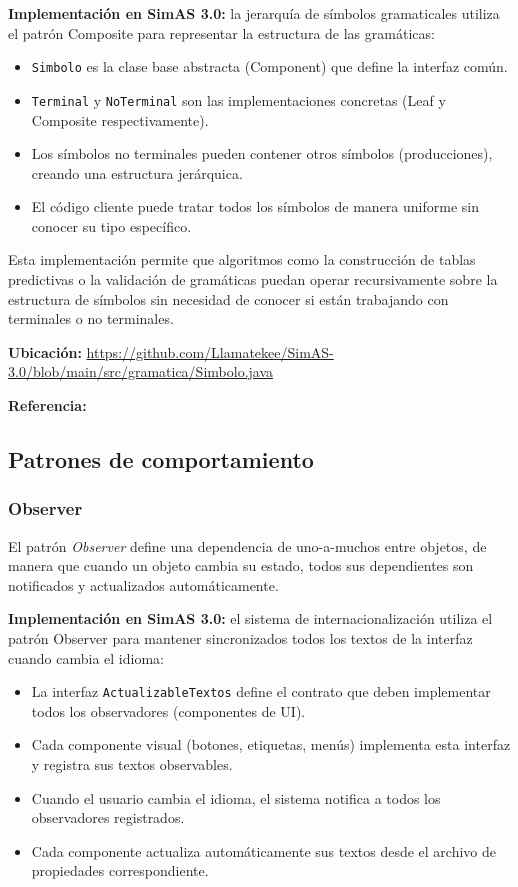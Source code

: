 \textbf{Implementación en SimAS 3.0:} la jerarquía de símbolos gramaticales utiliza el patrón Composite para representar la estructura de las gramáticas:

\begin{itemize}
    \item \texttt{Simbolo} es la clase base abstracta (Component) que define la interfaz común.
    \item \texttt{Terminal} y \texttt{NoTerminal} son las implementaciones concretas (Leaf y Composite respectivamente).
    \item Los símbolos no terminales pueden contener otros símbolos (producciones), creando una estructura jerárquica.
    \item El código cliente puede tratar todos los símbolos de manera uniforme sin conocer su tipo específico.
\end{itemize}

Esta implementación permite que algoritmos como la construcción de tablas predictivas o la validación de gramáticas puedan operar recursivamente sobre la estructura de símbolos sin necesidad de conocer si están trabajando con terminales o no terminales.

\textbf{Ubicación:} \url{https://github.com/Llamatekee/SimAS-3.0/blob/main/src/gramatica/Simbolo.java}

\textbf{Referencia:} \cite[pp. 163-173]{gamma1994design}

\subsection{Patrones de comportamiento}

\subsubsection{Observer}

El patrón \textit{Observer} define una dependencia de uno-a-muchos entre objetos, de manera que cuando un objeto cambia su estado, todos sus dependientes son notificados y actualizados automáticamente.

\textbf{Implementación en SimAS 3.0:} el sistema de internacionalización utiliza el patrón Observer para mantener sincronizados todos los textos de la interfaz cuando cambia el idioma:

\begin{itemize}
    \item La interfaz \texttt{ActualizableTextos} define el contrato que deben implementar todos los observadores (componentes de UI).
    \item Cada componente visual (botones, etiquetas, menús) implementa esta interfaz y registra sus textos observables.
    \item Cuando el usuario cambia el idioma, el sistema notifica a todos los observadores registrados.
    \item Cada componente actualiza automáticamente sus textos desde el archivo de propiedades correspondiente.
\end{itemize}

